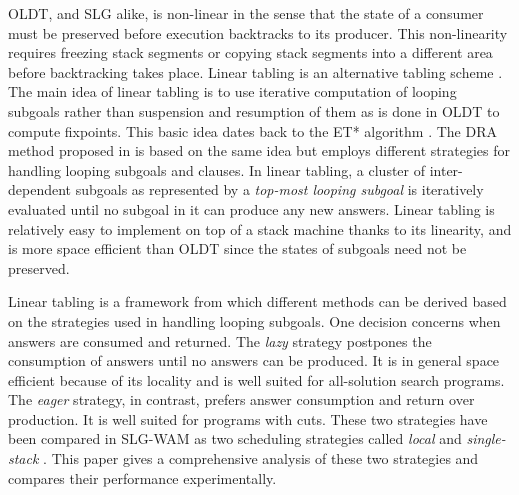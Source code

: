 \documentclass{tlp}
\begin{document}
OLDT, and SLG \cite{Chen96} alike, is non-linear in the sense that the state of a consumer must be preserved before execution backtracks to its producer. This non-linearity requires freezing stack segments \cite{Sagonas98} or copying stack segments into a different area \cite{Demoen99} before backtracking takes place. Linear tabling is an alternative tabling scheme \cite{Shen01,Zhou00,Zhou03,Zhou04}. The main idea of linear tabling is to use iterative computation of looping subgoals rather than suspension and resumption of them as is done in OLDT to compute fixpoints. This basic idea dates back to the ET* algorithm \cite{Dietrich87}. The DRA method proposed in \cite{Guo01} is based on the same idea but employs different strategies for handling looping subgoals and clauses. In linear tabling, a cluster of inter-dependent subgoals as represented by a {\it top-most looping subgoal} is iteratively evaluated until no subgoal in it can produce any new answers.  Linear tabling is relatively easy to implement on top of a stack machine thanks to its linearity, and is more space efficient than OLDT since the states of subgoals need not be preserved.

Linear tabling is a framework from which different methods can be derived based on the strategies used in handling looping subgoals. One decision concerns when answers are consumed and returned. The {\it lazy} strategy postpones the consumption of answers until no answers can be produced. It is in general space efficient because of its locality and is well suited for all-solution search programs. The {\it eager} strategy, in contrast, prefers answer consumption and return over production. It is well suited for programs with cuts. These two strategies have been compared in SLG-WAM as two scheduling strategies called {\it local} and {\it single-stack} \cite{Freire98}. This paper gives a comprehensive analysis of these two strategies and compares their performance experimentally.
\end{document}
